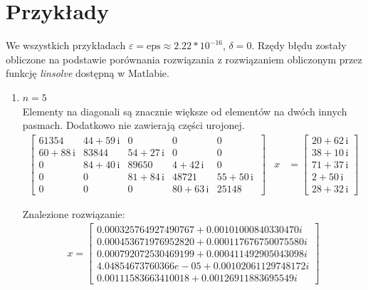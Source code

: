 \documentclass[12pt]{article}
\begin{document}
	\section{Przykłady}
	We wszystkich przykładach $\varepsilon = \text{eps} \approx 2.22 * 10^{-16}$, $\delta = 0$.
	Rzędy błędu zostały obliczone na podstawie porównania rozwiązania z rozwiązaniem obliczonym przez funkcję \textit{linsolve} dostępną w Matlabie.
	\begin{enumerate}[label=\textbf{Układ \arabic*}]
		\item
			$n = 5$ \\
			Elementy na diagonali są znacznie większe od elementów na dwóch innych pasmach. Dodatkowo nie zawierają części urojonej.
			\begin{align*}
				\left[
					\begin{array}{ccccc} 61354 & 44 + 59\, \mathrm{i} & 0 & 0 & 0\\ 60 + 88\, \mathrm{i} & 83844 & 54 + 27\, \mathrm{i} & 0 & 0\\ 0 & 84 + 40\, \mathrm{i} & 89650 & 4 + 42\, \mathrm{i} & 0\\ 0 & 0 & 81 + 84\, \mathrm{i} & 48721 & 55 + 50\, \mathrm{i}\\ 0 & 0 & 0 & 80 + 63\, \mathrm{i} & 25148 \end{array}\
				\right]
				&x
				&= 
				\left[
					\begin{array}{c} 20 + 62\, \mathrm{i}\\ 38 + 10\, \mathrm{i}\\ 71 + 37\, \mathrm{i}\\ 2 + 50\, \mathrm{i}\\ 28 + 32\, \mathrm{i} \end{array}
				\right]	
			\end{align*}
			
			Znalezione rozwiązanie:
			\begin{align*}
			x = 
				\left[
					\begin{array}{c}
					0.000325764927490767 + 0.00101000840330470i\\
					0.000453671976952820 + 0.000117676750075580i\\
					0.000792072530469199 + 0.000411492905043098i\\
					4.04854673760366e-05 + 0.00102061129748172i\\
					0.00111583663410018 + 0.00126911883695549i
					\end{array}
				\right]
			\end{align*}
			

\end{enumerate}
\end{document}
